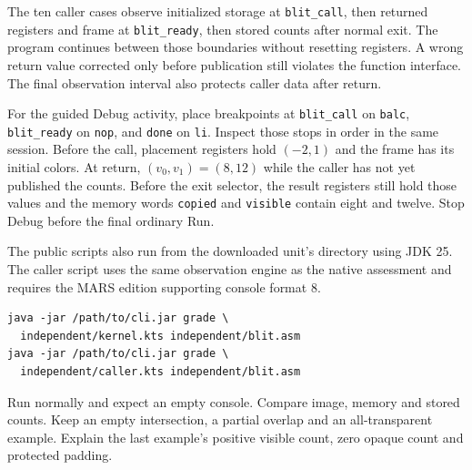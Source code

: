 The ten caller cases observe initialized storage at \texttt{blit\_call}, then
returned registers and frame at \texttt{blit\_ready}, then stored counts after
normal exit. The program continues between those boundaries without resetting
registers. A wrong return value corrected only before publication still violates
the function interface. The final observation interval also protects caller data
after return.

For the guided Debug activity, place breakpoints at \texttt{blit\_call} on
\texttt{balc}, \texttt{blit\_ready} on \texttt{nop}, and \texttt{done} on
\texttt{li}. Inspect those stops in order in the same session. Before the call,
placement registers hold $(-2,1)$ and the frame has its initial colors. At return,
$(v_0,v_1)=(8,12)$ while the caller has not yet published the counts. Before the
exit selector, the result registers still hold those values and the memory words
\texttt{copied} and \texttt{visible} contain eight and twelve. Stop Debug before
the final ordinary Run.

The public scripts also run from the downloaded unit's directory using JDK 25.
The caller script uses the same observation engine as the native assessment and
requires the MARS edition supporting console format 8.

\noindent\begin{minipage}{\linewidth}
  \begin{verbatim}
java -jar /path/to/cli.jar grade \
  independent/kernel.kts independent/blit.asm
java -jar /path/to/cli.jar grade \
  independent/caller.kts independent/blit.asm
\end{verbatim}
\end{minipage}

Run normally and expect an empty console. Compare image, memory and stored counts.
Keep an empty intersection, a partial overlap and an all-transparent example.
Explain the last example's positive visible count, zero opaque count and protected
padding.
